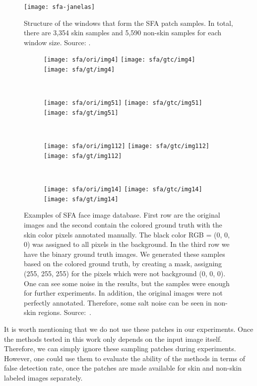 \begin{figure}[H]
  \centering
  \texttt{[image: sfa-janelas]}
  \caption[Structure of the windows that form the SFA patch samples]{Structure of the windows that form the SFA patch samples. In total, there are 3,354 skin samples and 5,590 non-skin samples for each window size. Source: \citet{sfa-skin-dataset:13}.}
  \label{fig:sfa_dataset_janelas}
\end{figure}

\begin{figure}[H]
    \centering
    \begin{subfigure}[t]{0.2\textwidth}
        \texttt{[image: sfa/ori/img4]}
        \texttt{[image: sfa/gtc/img4]}
        \texttt{[image: sfa/gt/img4]}
    \end{subfigure}
    ~
    \begin{subfigure}[t]{0.2\textwidth}
        \texttt{[image: sfa/ori/img51]}
        \texttt{[image: sfa/gtc/img51]}
        \texttt{[image: sfa/gt/img51]}
    \end{subfigure}
    ~
    \begin{subfigure}[t]{0.2\textwidth}
        \texttt{[image: sfa/ori/img112]}
        \texttt{[image: sfa/gtc/img112]}
        \texttt{[image: sfa/gt/img112]}
    \end{subfigure}
    ~ %
    \begin{subfigure}[t]{0.2\textwidth}
        \texttt{[image: sfa/ori/img14]}
        \texttt{[image: sfa/gtc/img14]}
        \texttt{[image: sfa/gt/img14]}
    \end{subfigure}
    \caption[Examples of SFA face image database]{Examples of SFA face image database. First row are the original images and the second contain the colored ground truth with the skin color pixels annotated manually. The black color RGB = (0, 0, 0) was assigned to all pixels in the background. In the third row we have the binary ground truth images. We generated these samples based on the colored ground truth, by creating a mask, assigning (255, 255, 255) for the pixels which were not background (0, 0, 0). One can see some noise in the results, but the samples were enough for further experiments. In addition, the original images were not perfectly annotated. Therefore, some salt noise can be seen in non-skin regions. Source:~\citet{sfa-skin-dataset:13}.}
    \label{fig:sfa_dataset_exemplo}
\end{figure}

It is worth mentioning that we do not use these patches in our experiments. Once the methods tested in this work only depends on the input image itself. Therefore, we can simply ignore these sampling patches during experiments. However, one could use them to evaluate the ability of the methods in terms of false detection rate, once the patches are made available for skin and non-skin labeled images separately.


